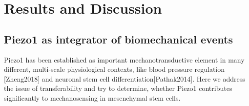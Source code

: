 \chapter{Results and Discussion}

\section{Piezo1 as integrator of biomechanical events}
Piezo1 has been established as important mechanotransductive element \cite{Murthy2017} \cite{Gudipaty2017} in many different, multi-scale physiological  contexts, like blood pressure regulation [Zheng2018] and neuronal stem cell differentiation[Pathak2014]. Here we address the issue of transferability and try to determine, whether Piezo1 contributes significantly to mechanosensing in mesenchymal stem cells.\\



